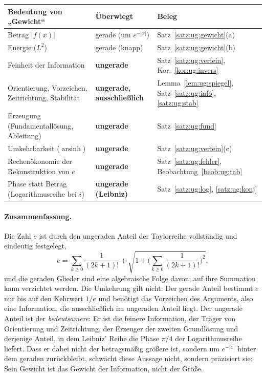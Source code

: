 \documentclass[a4paper,12pt,twoside]{report}
\theoremstyle{definition}
\begin{document}
\begin{center}
\small
\begin{tabular}{p{} p{} p{}}
\textbf{Bedeutung von „Gewicht“} & \textbf{Überwiegt} & \textbf{Beleg}\\\hline
Betrag $|f(x)|$ & gerade (um $e^{-|x|}$) & Satz~\ref{satz:ug:gewicht}(a)\\
Energie ($L^2$) & gerade (knapp) & Satz~\ref{satz:ug:gewicht}(b)\\
Feinheit der Information & \textbf{ungerade} & Satz~\ref{satz:ug:verfein}, Kor.~\ref{kor:ug:invers}\\
Orientierung, Vorzeichen, Zeitrichtung, Stabilität & \textbf{ungerade, ausschließlich} & Lemma~\ref{lem:ug:spiegel}, Satz~\ref{satz:ug:info}, \ref{satz:ug:stab}\\
Erzeugung (Fundamentallösung, Ableitung) & \textbf{ungerade} & Satz~\ref{satz:ug:fund}\\
Umkehrbarkeit ($\operatorname{arsinh}$) & \textbf{ungerade} & Satz~\ref{satz:ug:verfein}(c)\\
Rechenökonomie der Rekonstruktion von $e$ & \textbf{ungerade} & Satz~\ref{satz:ug:fehler}, Beobachtung~\ref{beob:ug:tab}\\
Phase statt Betrag (Logarithmusreihe bei $i$) & \textbf{ungerade (Leibniz)} & Satz~\ref{satz:ug:log}, \ref{satz:ug:konj}
\end{tabular}
\end{center}

\paragraph{Zusammenfassung.}
Die Zahl $e$ ist durch den ungeraden Anteil der Taylorreihe vollständig und eindeutig festgelegt,
\[
e=\sum_{k\ge0}\frac1{(2k+1)!}+\sqrt{1+\Big(\sum_{k\ge0}\frac1{(2k+1)!}\Big)^{2}},
\]
und die geraden Glieder sind eine algebraische Folge davon; auf ihre Summation kann verzichtet werden. Die Umkehrung gilt nicht: Der gerade Anteil bestimmt $e$ nur bis auf den Kehrwert $1/e$ und benötigt das Vorzeichen des Arguments, also eine Information, die ausschließlich im ungeraden Anteil liegt. Der ungerade Anteil ist der \emph{bedeutsamere}: Er ist die feinere Information, der Träger von Orientierung und Zeitrichtung, der Erzeuger der zweiten Grundlösung und derjenige Anteil, in dem Leibniz' Reihe die Phase $\pi/4$ der Logarithmusreihe liefert. Dass er dabei nicht der betragsmäßig größere ist, sondern um $e^{-|x|}$ hinter dem geraden zurückbleibt, schwächt diese Aussage nicht, sondern präzisiert sie: Sein Gewicht ist das Gewicht der Information, nicht der Größe.
\end{document}
